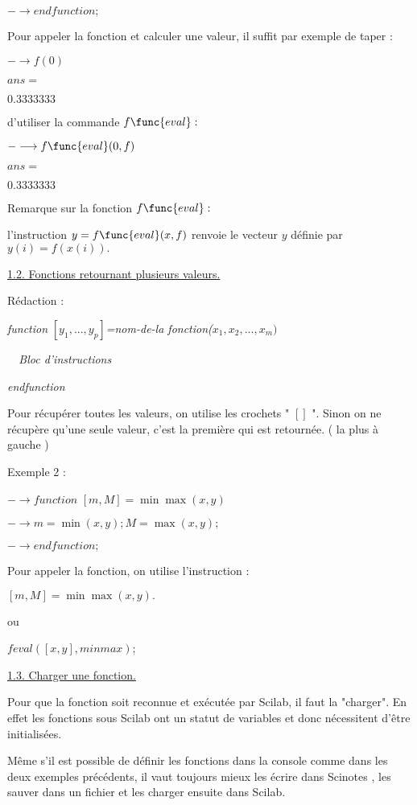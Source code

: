 \documentclass{article}
\begin{document}
$-\longrightarrow endfunction;$

Pour appeler la fonction et calculer une valeur, il suffit par exemple de
taper :

$-\longrightarrow f(0)$

$ans=$

$0.3333333$


d'utiliser la commande $f\func{eval}:$

$-\longrightarrow f\func{eval}(0,f)$

$ans=$

$0.3333333$

Remarque sur la fonction $f\func{eval}:$

l'instruction $y=f\func{eval}(x,f)$ renvoie le vecteur $y$ d\'{e}finie par $%
y(i)=f(x(i)).$

\underline{1.2. Fonctions retournant plusieurs valeurs.}

R\'{e}daction :

\textit{function }$[y_{1},...,y_{p}]$\textit{=nom-de-la fonction(}$%
x_{1},x_{2},...,x_{m})$

\textit{\ \ Bloc d'instructions}

\textit{endfunction}

Pour r\'{e}cup\'{e}rer toutes les valeurs, on utilise les crochets " $\left[
{}\right] $ ". Sinon on ne r\'{e}cup\`{e}re qu'une seule valeur, c'est la
premi\`{e}re qui est retourn\'{e}e. ( la plus \`{a} gauche )

Exemple 2 :

$-\longrightarrow function$ $\left[ m,M\right] =\min \max (x,y)$

$-\longrightarrow m=\min (x,y);M=\max (x,y);$

$-\longrightarrow endfunction;$

Pour appeler la fonction, on utilise l'instruction :\ 

$\left[ m,M\right] =\min \max (x,y).$

ou

$feval([x,y],minmax)$;

\underline{1.3. Charger une fonction.}

Pour que la fonction soit reconnue et ex\'{e}cut\'{e}e par Scilab, il faut
la "charger". En effet les fonctions sous Scilab ont un statut de variables
et donc n\'{e}cessitent d'\^{e}tre initialis\'{e}es.

M\^{e}me s'il est possible de d\'{e}finir les fonctions dans la console
comme dans les deux exemples pr\'{e}c\'{e}dents, il vaut toujours mieux les 
\'{e}crire dans Scinotes , les sauver dans un fichier et les charger ensuite
dans Scilab.
\end{document}
